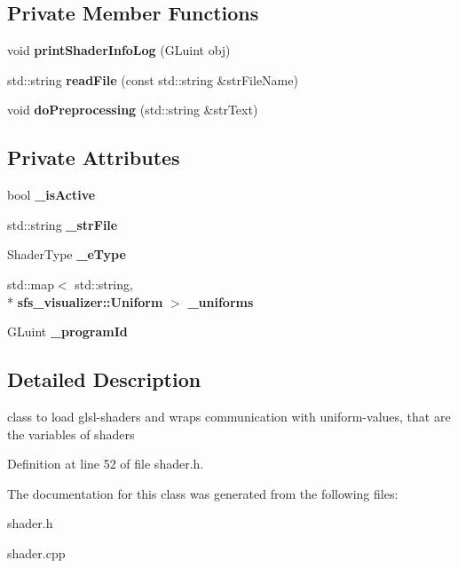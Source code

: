 \subsection*{Private Member Functions}
\begin{DoxyCompactItemize}
\item 
void {\bfseries print\-Shader\-Info\-Log} (G\-Luint obj)\label{classsfs__visualizer_1_1Shader_a9c337c0dfcaf6a71ac6af7f6e75491eb}

\item 
std\-::string {\bfseries read\-File} (const std\-::string \&str\-File\-Name)\label{classsfs__visualizer_1_1Shader_a492073213e8668a330a327cee21f9418}

\item 
void {\bfseries do\-Preprocessing} (std\-::string \&str\-Text)\label{classsfs__visualizer_1_1Shader_ac122180bc89600c2932a7a65e805815e}

\end{DoxyCompactItemize}
\subsection*{Private Attributes}
\begin{DoxyCompactItemize}
\item 
bool {\bfseries \-\_\-is\-Active}\label{classsfs__visualizer_1_1Shader_ac22f274abcb33588ad9e1815a960f33c}

\item 
std\-::string {\bfseries \-\_\-str\-File}\label{classsfs__visualizer_1_1Shader_af8fd08acce17bfc88b0cfe9136c982ca}

\item 
Shader\-Type {\bfseries \-\_\-e\-Type}\label{classsfs__visualizer_1_1Shader_af546a04c628927c44edb9d088149433e}

\item 
std\-::map$<$ std\-::string, \\*
{\bf sfs\-\_\-visualizer\-::\-Uniform} $>$ {\bfseries \-\_\-uniforms}\label{classsfs__visualizer_1_1Shader_a849d6a90553c7f1d556414d965e12444}

\item 
G\-Luint {\bfseries \-\_\-program\-Id}\label{classsfs__visualizer_1_1Shader_a000cea3767f7e0357c04da5b94fa9b61}

\end{DoxyCompactItemize}


\subsection{Detailed Description}
class to load glsl-\/shaders and wraps communication with uniform-\/values, that are the variables of shaders 

Definition at line 52 of file shader.\-h.



The documentation for this class was generated from the following files\-:\begin{DoxyCompactItemize}
\item 
shader.\-h\item 
shader.\-cpp\end{DoxyCompactItemize}
